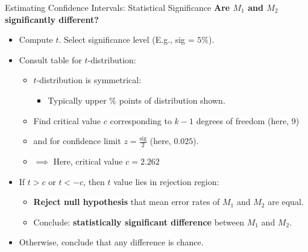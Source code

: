 \begin{frame}{Estimating Confidence Intervals: Statistical Significance}
  \textbf{Are $M_1$ and $M_2$ {\color{airforceblue} significantly different}?}
  \begin{itemize}
  \item Compute $t$. Select significance level (E.g., sig = $5 \%$).
  \item Consult table for $t$-distribution:
    \begin{itemize}
    \item $t$-distribution is symmetrical:
      \begin{itemize}
      \item Typically upper $\%$ points of distribution shown.
      \end{itemize}
    \item Find critical value $c$ corresponding to $k-1$ degrees of freedom (here, $9$)
    \item and for confidence limit $z = \frac{\text{sig}}{2}$ (here, $0.025$).
    \item $\implies$ Here, critical value $c = 2.262$
    \end{itemize}
  \item If $t > c$ or $t < -c$, then $t$ value lies in rejection region:
    \begin{itemize}
    \item \textbf{Reject null hypothesis} that mean error rates of $M_1$ and $M_2$ are equal.
    \item Conclude: \textbf{statistically significant difference} between $M_1$ and $M_2$.
    \end{itemize}
  \item Otherwise, conclude that any difference is chance.
  \end{itemize}

\end{frame}

